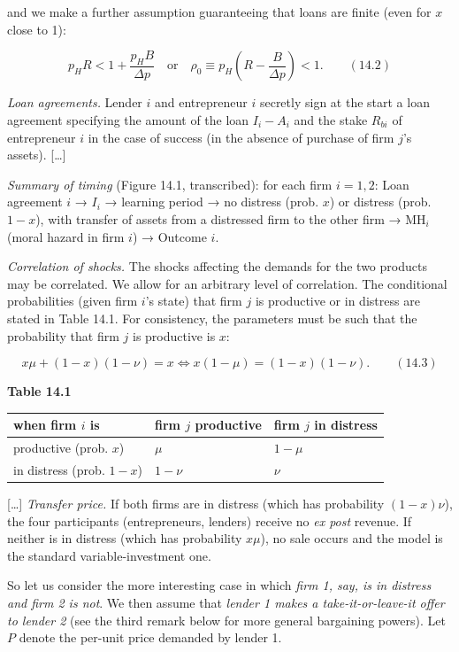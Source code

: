\documentclass[11pt,a4paper]{article}
\begin{document}
and we make a further assumption guaranteeing that loans are finite (even for \(x\) close to 1):

\[p_H R < 1 + \frac{p_H B}{\Delta p} \quad\text{or}\quad \rho_0 \equiv p_H\left(R - \frac{B}{\Delta p}\right) < 1. \qquad (14.2)\]

\emph{Loan agreements.} Lender \(i\) and entrepreneur \(i\) secretly sign at the start a loan
agreement specifying the amount of the loan \(I_i - A_i\) and the stake \(R_{bi}\) of entrepreneur
\(i\) in the case of success (in the absence of purchase of firm \(j\)'s assets). {[}\ldots{]}

\emph{Summary of timing} (Figure 14.1, transcribed): for each firm \(i = 1, 2\): Loan agreement
\(i\) → \(I_i\) → learning period → no distress (prob. \(x\)) or distress (prob. \(1 - x\)), with
transfer of assets from a distressed firm to the other firm → MH\(_i\) (moral hazard in firm \(i\))
→ Outcome \(i\).

\emph{Correlation of shocks.} The shocks affecting the demands for the two products may be
correlated. We allow for an arbitrary level of correlation. The conditional probabilities (given
firm \(i\)'s state) that firm \(j\) is productive or in distress are stated in Table 14.1. For
consistency, the parameters must be such that the probability that firm \(j\) is productive is
\(x\):

\[x\mu + (1 - x)(1 - \nu) = x \iff x(1 - \mu) = (1 - x)(1 - \nu). \qquad (14.3)\]

\textbf{Table 14.1}

{\def\LTcaptype{none} %
\begin{longtable}[]{@{}lll@{}}
\toprule\noalign{}
when firm \(i\) is & firm \(j\) productive & firm \(j\) in distress \\
\midrule\noalign{}
\endhead
\bottomrule\noalign{}
\endlastfoot
productive (prob. \(x\)) & \(\mu\) & \(1 - \mu\) \\
in distress (prob. \(1 - x\)) & \(1 - \nu\) & \(\nu\) \\
\end{longtable}
}

{[}\ldots{]} \emph{Transfer price.} If both firms are in distress (which has probability
\((1 - x)\nu\)), the four participants (entrepreneurs, lenders) receive no \emph{ex post} revenue.
If neither is in distress (which has probability \(x\mu\)), no sale occurs and the model is the
standard variable-investment one.

So let us consider the more interesting case in which \emph{firm 1, say, is in distress and firm 2
is not}. We then assume that \emph{lender 1 makes a take-it-or-leave-it offer to lender 2} (see the
third remark below for more general bargaining powers). Let \(P\) denote the per-unit price demanded
by lender 1.
\end{document}
